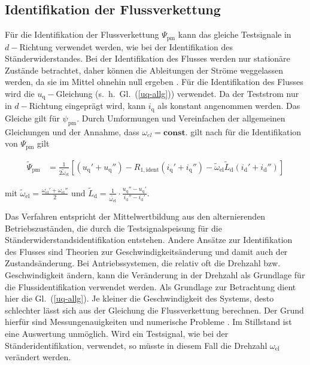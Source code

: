 \documentclass[conference,twocolumn]{IEEEtran}
\newcommand{\x}[1]{\mathrm{#1}}
\begin{document}
\subsection{Identifikation der Flussverkettung}\label{sec:ident-fluss}

Für die Identifikation der Flussverkettung $\Psi_\x{pm}$ kann das gleiche Testsignale in $d-$Richtung verwendet werden, wie bei der Identifikation des Ständerwiderstandes.
Bei der Identifikation des Flusses werden nur stationäre Zustände betrachtet, daher können die Ableitungen der Ströme weggelassen werden, da sie im Mittel ohnehin null ergeben \autocite{Kellner2012}.
Für die Identifikation des Flusses wird die $u_\x{q}-$Gleichung (s.~h.~Gl.~(\ref{uq-allg})) verwendet.
Da der Teststrom nur in $d-$Richtung eingeprägt wird, kann $i_\x{q}$ als konstant angenommen werden.
Das Gleiche gilt für $\psi_\x{pm}$.
Durch Umformungen und Vereinfachen der allgemeinen Gleichungen und der Annahme, dass $\omega_{el}=\textbf{const.}$ gilt nach \textcite{Kellner2012} für die Identifikation von $\Psi_\x{pm}$ gilt

\begin{small}
\begin{align}
\tilde{\Psi}_\x{pm} &= \frac{1}{2\tilde{\omega}_\x{el}} [(u_\x{q}' + u_\x{q}'') - R_\x{1,ident}(i_\x{q}' + i_\x{q}'')-\tilde{\omega}_\x{el}\tilde{L}_\x{d}(i_\x{d}' + i_\x{d}'')]
\end{align}
\end{small}

mit $\tilde{\omega}_\x{el}=\frac{\omega_\x{el}'+\omega_\x{el}''}{2}$ und $\tilde{L}_\x{d} = \frac{1}{\tilde{\omega_\x{el}}}\cdot \frac{u_\x{q}'' - u_\x{q}'}{i_\x{d}''-i_\x{d}'}$.

Das Verfahren entspricht der Mittelwertbildung aus den alternierenden Betriebszuständen, die durch die Testsignalspeisung für die Ständerwiderstandsidentifikation entstehen.
Andere Ansätze zur Identifikation des Flusses sind Theorien zur Geschwindigkeitsänderung und damit auch der Zustandsänderung.
Bei Antriebssystemen, die relativ oft die Drehzahl bzw. Geschwindigkeit ändern, kann die Veränderung in der Drehzahl als Grundlage für die Flussidentifikation verwendet werden.
Als Grundlage zur Betrachtung dient hier die Gl.~(\ref{uq-allg}).
Je kleiner die Geschwindigkeit des Systems, desto schlechter lässt sich aus der Gleichung die Flussverkettung berechnen.
Der Grund hierfür sind Messungenauigkeiten und numerische Probleme \autocite{knorrenschild2}.
Im Stillstand ist eine Auswertung unmöglich.
Wird ein Testsignal, wie bei der Ständeridentifikation, verwendet, so müsste in diesem Fall die Drehzahl $\omega_\x{el}$ verändert werden.
\end{document}
